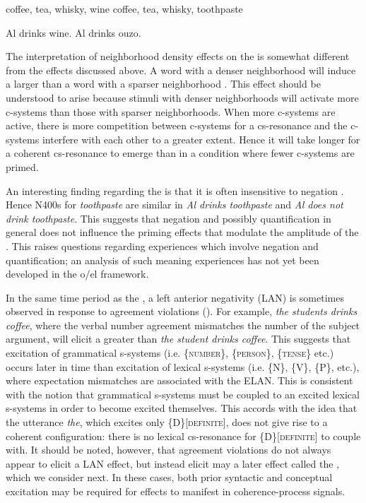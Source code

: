 \ea\label{ex:6:25}
\ea\label{ex:6:25a} coffee, tea, whisky, wine
\ex\label{ex:6:25b}  coffee, tea, whisky, toothpaste
\z
\z

\ea\label{ex:6:26}
\ea\label{ex:6:26a} Al drinks wine.
\ex\label{ex:6:26b} Al drinks ouzo.
\z
\z

  The interpretation of neighborhood density effects on the  is somewhat different from the effects discussed above. A word with a denser neighborhood will induce a larger  than a word with a sparser neighborhood \citep{HolcombEtAl2002,MüllerEtAl2010}. This effect should be understood to arise because stimuli with denser neighborhoods will activate more c-systems than those with sparser neighborhoods. When more c-systems are active, there is more competition between c-systems for a cs-resonance and the c-systems interfere with each other to a greater extent. Hence it will take longer for a coherent cs-resonance to emerge than in a condition where fewer c-systems are primed. 

  An interesting finding regarding the  is that it is often insensitive to negation \citep{KutasFedermeier2011}. Hence N400s for \textit{toothpaste} are similar in \textit{Al drinks toothpaste} and \textit{Al does not drink toothpaste}. This suggests that negation and possibly quantification in general does not influence the priming effects that modulate the amplitude of the . This raises questions regarding  experiences which involve negation and quantification; an analysis of such meaning experiences has not yet been developed in the o/el framework.

  In the same time period as the , a left anterior negativity (LAN) is sometimes observed in response to  agreement violations (\citealt{Friederici2002,GunterEtAl2000,KutasFedermeier2011,OsterhoutHolcomb1992}). For example, \textit{the students drinks coffee}, where the verbal number agreement mismatches the number of the subject argument, will elicit a greater  than \textit{the student drinks coffee}. This suggests that excitation of grammatical s-systems (i.e. \{\textsc{number}\}, \{\textsc{person}\}, \{\textsc{tense}\} etc.) occurs later in time than excitation of lexical s-systems (i.e. \{N\}, \{V\}, \{P\}, etc.), where expectation mismatches are associated with the ELAN. This is consistent with the notion that grammatical s-systems must be coupled to an excited lexical s-systems in order to become excited themselves. This accords with the idea that the utterance \textit{the}, which excites only \{D\}[\textsc{definite}], does not give rise to a coherent configuration: there is no lexical cs-resonance for \{D\}[\textsc{definite}] to couple with. It should be noted, however, that agreement violations do not always appear to elicit a LAN effect, but instead elicit may a later effect called the , which we consider next. In these cases, both prior syntactic and conceptual excitation may be required for effects to manifest in coherence-process signals.

